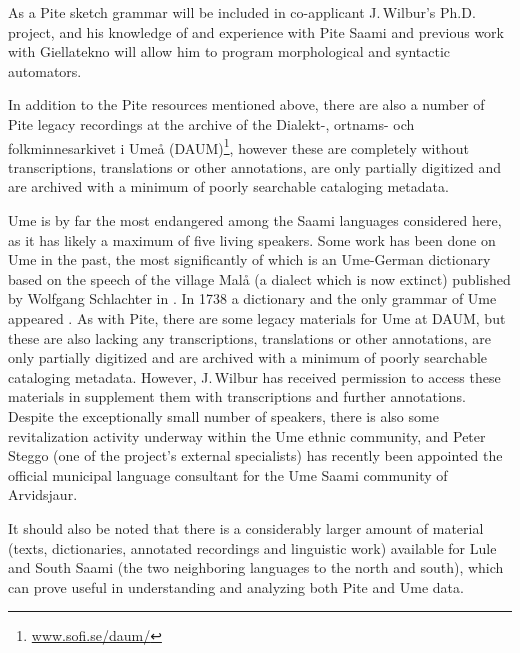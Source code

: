 \documentclass[a4paper,12pt]{article}
\begin{document}
As a Pite sketch grammar will be included in co-applicant J.\,Wilbur's Ph.D. project, and his knowledge of and experience with Pite Saami and previous work with Giellatekno will allow him to program morphological and syntactic automators.

In addition to the Pite resources mentioned above, there are also a number of Pite legacy recordings at the archive of the Dialekt-, ortnams- och folkminnesarkivet i Umeå (DAUM)\footnote{\url{www.sofi.se/daum/}}, however these are completely without transcriptions, translations or other annotations, are only partially digitized and are archived with a minimum of poorly searchable cataloging metadata.

Ume is by far the most endangered among the Saami languages considered here, as it has likely a maximum of five living speakers. Some work has been done on Ume in the past, the most significantly of which is an Ume-German dictionary based on the speech of the village Malå (a dialect which is now extinct) published by Wolfgang Schlachter in \citeyear{schlachter1958}. In 1738 a dictionary and the only grammar of Ume appeared \cite{fjellstrom1738a,fjellstrom1738b}.
As with Pite, there are some legacy materials for Ume at DAUM, but these are also lacking any transcriptions, translations or other annotations, are only partially digitized and are archived with a minimum of poorly searchable cataloging metadata. However, J.\,Wilbur has received permission to access these materials in supplement them with transcriptions and further annotations.
Despite the exceptionally small number of speakers, there is also some revitalization activity underway within the Ume ethnic community, and Peter Steggo (one of the project's external specialists) has recently been appointed the official municipal language consultant for the Ume Saami community of Arvidsjaur.

It should also be noted that there is a considerably larger amount of material (texts, dictionaries, annotated recordings and linguistic work)  available for Lule and South Saami (the two neighboring languages to the north and south), which can prove useful in understanding and analyzing both Pite and Ume data.
\end{document}
